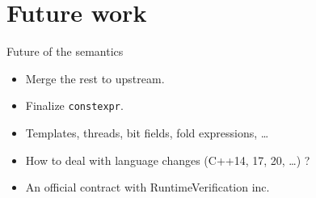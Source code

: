 \documentclass[11pt]{beamer}
\begin{document}
\section{Future work}


%
\begin{frame}{Future of the semantics}
\begin{itemize}
\pause \item Merge the rest to upstream.
\pause \item Finalize \texttt{constexpr}.
\pause \item Templates, threads, bit fields, fold expressions, \ldots
\pause \item How to deal with language changes (C++14, 17, 20, \ldots) ?
\pause \item An official contract with RuntimeVerification inc.
\end{itemize}
\end{frame}

\end{document}
